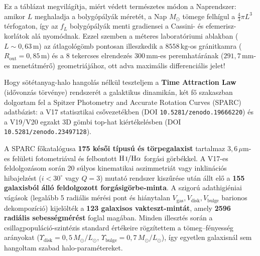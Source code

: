 Ez a t\'abl\'azat megvil\'ag\'itja, mi\'ert v\'edett term\'eszetes m\'odon a Naprendszer: amikor $L$ meghaladja a bolyg\'op\'aly\'ak m\'eret\'et, a Nap $M_\odot$ t\"omege felh\'igul a $\frac{4}{3}\pi L^3$ t\'erfogaton, \'igy az $f_L$ bolyg\'op\'aly\'ak menti gradiensei a Cassini- \'es efemerisz-korl\'atok al\'a nyom\'odnak. Ezzel szemben a m\'eteres laborat\'oriumi ablakban ($L \sim 0{,}63\,\text{m}$) az \'atlagol\'og\"omb pontosan illeszkedik a $8558\,\text{kg}$-os gr\'anitkamra ($R_{\text{out}}=0{,}85\,\text{m}$) \'es a 8 tekercses elrendez\'es $300\,\text{mm}$-es peremhat\'ar\'anak ($291{,}7\,\text{mm}$-es menet\'atm\'er\H{o}) geometri\'aj\'ahoz, ott adva maxim\'alis differenci\'alis jelet!
\newpage


Hogy s\"ot\'etanyag-halo hangol\'as n\'elk\"ul teszteljem a \textbf{Time Attraction Law} (id\H{o}vonz\'as t\"orv\'enye) rendszer\'et a galaktikus dinamik\'an, k\'et f\H{o} szakaszban dolgoztam fel a Spitzer Photometry and Accurate Rotation Curves (SPARC) adatb\'azist: a V17 statisztikai cs\H{o}vezet\'ekben (DOI \texttt{10.5281/zenodo.19666220}) \'es a V19/V20 egzakt 3D g\"ombi top-hat ki\'ert\'ekel\'esben (DOI \texttt{10.5281/zenodo.23497128}).

\par
A SPARC f\H{o}katal\'ogusa \textbf{175 k\'es\H{o}i t\'ipus\'u \'es t\"orpegalaxist} tartalmaz $3{,}6\,\mu\text{m}$-es fel\"uleti fotometri\'aval \'es felbontott $\text{H\,\textsc{i}}/\text{H}\alpha$ forg\'asi g\"orb\'ekkel. A V17-es feldolgoz\'asom sor\'an 20 s\'ulyos kinematikai aszimmetri\'at vagy inklin\'aci\'os hibajelz\'est ($i < 30^\circ$ vagy $Q=3$) mutat\'o rendszer kisz\H{u}r\'ese ut\'an \'allt el\H{o} a \textbf{155 galaxisb\'ol \'all\'o feldolgozott forg\'asig\"orbe-minta}. A szigor\'u adathigi\'eniai v\'ag\'asok (legal\'abb 5 radi\'alis m\'er\'esi pont \'es hi\'anytalan $V_{\text{gas}}, V_{\text{disk}}, V_{\text{bulge}}$ barionos dekompoz\'ici\'o) kijel\"olt\'ek a \textbf{123 galaxisos vakteszt-mint\'at}, amely \textbf{2596 radi\'alis sebess\'egm\'er\'est} foglal mag\'aban. Minden illeszt\'es sor\'an a csillagpopul\'aci\'o-szint\'ezis standard \'ert\'ekeire r\"ogz\'itettem a t\"omeg--f\'enyess\'eg ar\'anyokat ($\Upsilon_{\text{disk}} = 0{,}5\,M_\odot/L_\odot$, $\Upsilon_{\text{bulge}} = 0{,}7\,M_\odot/L_\odot$), \'igy egyetlen galaxisn\'al sem hangoltam szabad halo-param\'etereket.

